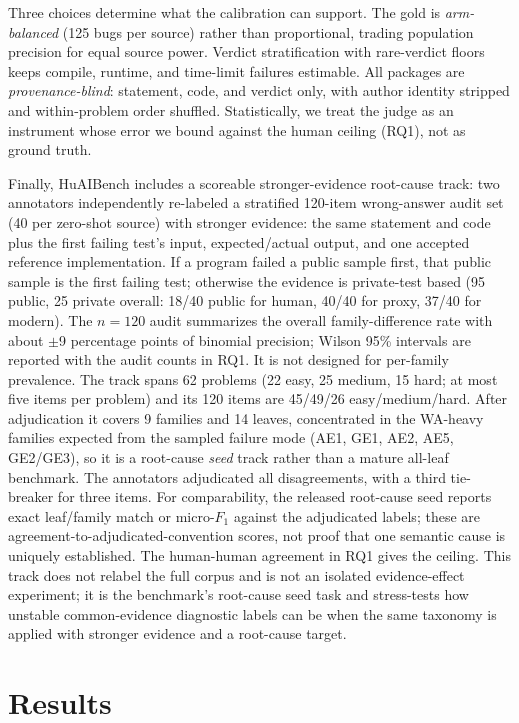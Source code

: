 \documentclass[conference]{IEEEtran}
\begin{document}
Three choices determine what the calibration can support. The gold is
\emph{arm-balanced} (125 bugs per source) rather than proportional, trading
population precision for equal source power. Verdict stratification with
rare-verdict floors keeps compile, runtime, and time-limit failures estimable. All
packages are \emph{provenance-blind}: statement, code, and verdict only, with author
identity stripped and within-problem order shuffled. Statistically, we treat the
judge as an instrument whose error we bound against the human ceiling (RQ1), not as
ground truth.

Finally, HuAIBench includes a scoreable stronger-evidence root-cause track: two
annotators independently re-labeled a stratified 120-item wrong-answer audit set (40
per zero-shot source) with stronger evidence: the same statement and code plus the first failing test's input,
expected/actual output, and one accepted reference implementation. If a program
failed a public sample first, that public sample is the first failing test; otherwise
the evidence is private-test based (95 public, 25 private overall: 18/40 public for
human, 40/40 for proxy, 37/40 for modern). The $n{=}120$ audit summarizes the overall
family-difference rate with about $\pm$9 percentage points of binomial precision; Wilson
95\% intervals are reported with the audit counts in RQ1. It is
not designed for per-family prevalence. The track spans 62 problems (22 easy, 25
medium, 15 hard; at most five items per problem) and its 120 items are 45/49/26
easy/medium/hard. After adjudication it covers 9 families and 14 leaves, concentrated
in the WA-heavy families expected from the sampled failure mode (AE1, GE1, AE2, AE5,
GE2/GE3), so it is a root-cause \emph{seed} track rather than a mature all-leaf
benchmark. The annotators adjudicated all disagreements, with a third tie-breaker
for three items. For comparability, the released root-cause seed reports exact
leaf/family match or micro-$F_1$ against the adjudicated labels; these are
agreement-to-adjudicated-convention scores, not proof that one semantic cause is
uniquely established. The human-human agreement in RQ1 gives the ceiling. This
track does not relabel the full corpus and is not an isolated
evidence-effect experiment; it is the benchmark's root-cause seed task and
stress-tests how unstable common-evidence diagnostic labels can be when the same
taxonomy is applied with stronger evidence and a root-cause target.

\section{Results}
\label{sec:results}
\end{document}
